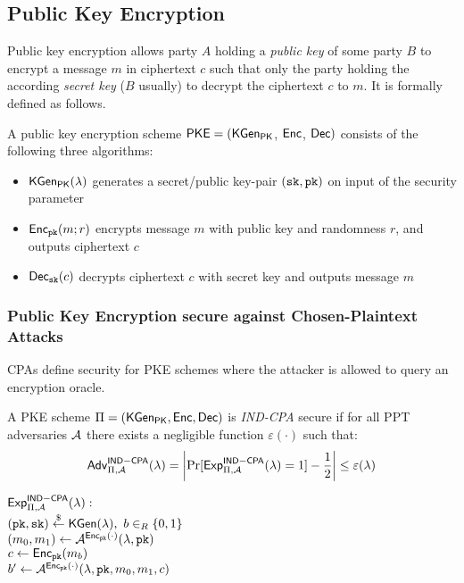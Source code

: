 

\subsection{Public Key Encryption}

Public key encryption allows party $A$ holding a \emph{public key \pk} of some party $B$ to encrypt a message $m$ in ciphertext $c$ such that only the party holding the according \emph{secret key \sk} ($B$ usually) to decrypt the ciphertext $c$ to $m$.
It is formally defined as follows.

\begin{definition}\label{def:pkencryption}
A public key encryption scheme $\mathsf{PKE}=(\mathsf{KGen_{PK}}$, $\mathsf{Enc}$, $\mathsf{Dec})$ consists of the following three algorithms:
\begin{itemize}
  \item $\mathsf{KGen_{PK}}(\lambda)$ generates a secret/public key-pair $(\mathtt{sk},\mathtt{pk})$ on input of the security parameter \secpar
  \item $\mathsf{Enc}_\mathtt{pk}(m; r)$ encrypts message $m$ with public key \pk and randomness $r$, and outputs ciphertext $c$
  \item $\mathsf{Dec}_\mathtt{sk}(c)$ decrypts ciphertext $c$ with secret key \sk and outputs message $m$
\end{itemize}
\end{definition}


\subsubsection{Public Key Encryption secure against Chosen-Plaintext Attacks}
\acp{CPA} define security for \ac{PKE} schemes where the attacker is allowed to query an encryption oracle.

\begin{definition}\label{def:indcpa}
A \ac{PKE} scheme $\Pi=(\mathsf{KGen_{PK}},\mathsf{Enc},\mathsf{Dec})$ is \emph{IND-CPA} secure if for all \ac{PPT} adversaries $\mathcal{A}$ there exists a negligible function $\varepsilon(\cdot)$ such that:
\[\mathsf{Adv}_{\Pi,\mathcal{A}}^{\mathsf{IND-CPA}}(\lambda)=\left|\Pr[\mathsf{Exp}^{\mathsf{IND-CPA}}_{\Pi,\mathcal{A}}(\lambda)=1]-\frac12\right|\leq\varepsilon(\lambda)\]

\noindent
$\mathsf{Exp}^{\mathsf{IND-CPA}}_{\Pi,\mathcal{A}}(\lambda):$\\
\hspace*{2em}$(\mathtt{pk},\mathtt{sk})\stackrel{\$}{\gets}\mathsf{KGen}(\lambda),~b\in_R\{0,1\}$\\
\hspace*{2em}$(m_0,m_1)\gets\mathcal{A}^{\mathsf{Enc}_\mathtt{pk}(\cdot)}(\lambda,\mathtt{pk})$\\
\hspace*{2em}$c\gets\mathsf{Enc}_\mathtt{pk}(m_b)$\\
\hspace*{2em}$b'\gets\mathcal{A}^{\mathsf{Enc}_\mathtt{pk}(\cdot)}(\lambda,\mathtt{pk},m_0,m_1,c)$\\
\eod
\end{definition}


